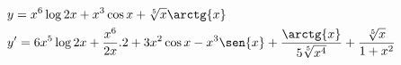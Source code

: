 \begin{ex}
\begin{align}
&y=x^6\log{2x}+x^3\cos{x}+\sqrt[5]{x}\arctg{x}\nonumber\\
&y'=6x^5\log{2x}+\frac{x^6}{2x}.2+3x^2\cos{x}-x^3\sen{x}+\frac{\arctg{x}}{5\sqrt[5]{x^4}}+\frac{\sqrt[5]{x}}{1+x^2}\nonumber
\end{align}
\end{ex}